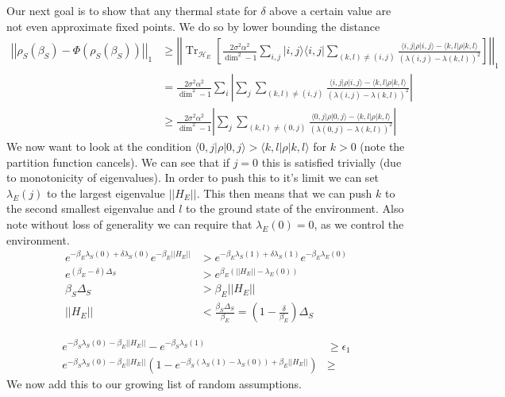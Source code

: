 \documentclass{article}
\newcommand{\ket}[1]{|#1\rangle}
\newcommand{\bra}[1]{\langle #1|}
\newcommand{\ketbra}[2]{| #1\rangle\! \langle #2|}
\newcommand{\parens}[1]{\left( #1 \right)}
\newcommand{\brackets}[1]{\left[ #1 \right]}
\newcommand{\abs}[1]{\left| #1 \right|}
\newcommand{\norm}[1]{\left| \left| #1 \right| \right|}
\DeclareMathOperator{\Tr}{Tr}
\newcommand{\partrace}[2]{\Tr_{#1} \brackets{ #2 }}
\newcommand{\hilb}{\mathcal{H}}
\begin{document}
Our next goal is to show that any thermal state for $\delta$ above a certain value are not even approximate fixed points. We do so by lower bounding the distance 
\begin{align}
    \norm{\rho_S(\beta_S) - \Phi(\rho_S(\beta_S))}_1 &\geq \norm{\partrace{\hilb_E}{\frac{2 \sigma^2 \alpha^2}{\dim^2 - 1} \sum_{i,j} \ketbra{i,j}{i,j} \sum_{(k,l) \neq (i,j)} \frac{\bra{i,j} \rho \ket{i,j} - \bra{k,l} \rho \ket{k,l}}{(\lambda(i,j) - \lambda(k,l))^2}}}_1 \\
    &= \frac{2 \sigma^2 \alpha^2}{\dim^2 - 1} \sum_i \abs{\sum_j \sum_{(k,l) \neq (i,j)} \frac{\bra{i,j} \rho \ket{i,j} - \bra{k,l} \rho \ket{k,l}}{(\lambda(i,j) - \lambda(k,l))^2}} \\
    &\geq \frac{2 \sigma^2 \alpha^2}{\dim^2 - 1} \abs{\sum_{j} \sum_{(k,l) \neq (0,j)} \frac{\bra{0,j} \rho \ket{0,j} - \bra{k,l} \rho \ket{k,l}}{(\lambda(0,j) - \lambda(k,l))^2}} \label{eq:i_need_an_eq_label}
\end{align}
We now want to look at the condition $\bra{0,j} \rho \ket{0,j} > \bra{k,l} \rho \ket{k,l}$ for $k > 0$ (note the partition function cancels). We can see that if $j=0$ this is satisfied trivially (due to monotonicity of eigenvalues). In order to push this to it's limit we can set $\lambda_E(j)$ to the largest eigenvalue $\norm{H_E}$. This then means that we can push $k$ to the second smallest eigenvalue and $l$ to the ground state of the environment. Also note without loss of generality we can require that $\lambda_E(0) = 0$, as we control the environment.
\begin{align}
    e^{-\beta_E \lambda_S (0) + \delta \lambda_S(0)} e^{-\beta_E \norm{H_E}} &> e^{-\beta_E \lambda_S(1) + \delta \lambda_S(1)} e^{-\beta_E \lambda_E(0)} \\
    e^{(\beta_E - \delta) \Delta_S} &> e^{\beta_E(\norm{H_E} - \lambda_E(0))} \\
    \beta_S \Delta_S &> \beta_E \norm{H_E} \\
    \norm{H_E} &< \frac{\beta_S \Delta_S}{\beta_E} = \parens{1 - \frac{\delta}{\beta_E}} \Delta_S
\end{align}

\begin{align}
    e^{-\beta_S \lambda_S(0) - \beta_E \norm{H_E}} - e^{-\beta_S \lambda_S(1)} &\geq \epsilon_1 \\
    e^{-\beta_S \lambda_S(0) - \beta_E \norm{H_E}} (1 - e^{-\beta_S (\lambda_S(1) - \lambda_S(0)) + \beta_E \norm{H_E} }) & \geq 
\end{align}
We now add this to our growing list of random assumptions. 
\end{document}
